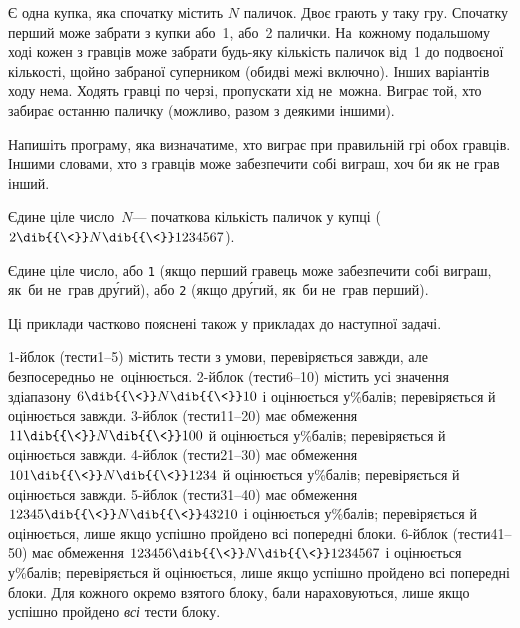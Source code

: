 
Є одна купка, яка спочатку містить $N$ паличок.
Двоє грають у таку гру.
Спочатку перший 
може забрати з купки або~1, або~2 палички.
На~кожному подальшому ході кожен з гравців може забрати 
будь-яку кількість паличок від~1 до подвоєної кількості, щойно забраної суперником (обидві межі включно).
Інших
варіантів ходу нема. 
Ходять гравці по черзі, пропускати хід не~можна.
Виграє той, хто забирає останню паличку (можливо, разом з деякими іншими).

Напишіть програму, яка визначатиме, хто виграє при правильній грі обох гравців. 
Іншими словами, хто з гравців може забезпечити собі виграш, хоч би як не грав інший.



\InputFile
Єдине ціле число~$N$\nolinebreak[3] --- початкова кількість паличок у купці
($2\dib{{\<}}N\dib{{\<}}1234567$).

\OutputFile
Єдине ціле число, або \texttt{1} (якщо перший гравець може забезпечити собі виграш, як~би не~грав др\'{у}гий), або \texttt{2} (якщо др\'{у}гий, як~би не~грав перший).

\Examples
\begin{exampleSimple}{5em}{5em}
\end{exampleSimple}


\Note Ці приклади частково пояснені також у прикладах до наступної задачі.

{

\Scoring{}\label{text:201819-2-D-scoring-begin}
\mbox{1-й}\nolinebreak[3] блок (тести\nolinebreak[3] \mbox{1--5}) містить тести з умови, перевіряється завжди, але безпосередньо не~оцінюється.
%
\mbox{2-й}\nolinebreak[3] блок (тести\nolinebreak[3] \mbox{6--10}) містить усі значення з\nolinebreak[3] діапазону $6\dib{{\<}}N\dib{{\<}}10$ і оцінюється у\%\nolinebreak[3] балів; перевіряється й оцінюється завжди.
%
\mbox{3-й}\nolinebreak[3] блок (тести\nolinebreak[3] \mbox{11--20}) має обмеження $11\dib{{\<}}N\dib{{\<}}100$ й оцінюється у\%\nolinebreak[3] балів; перевіряється й оцінюється завжди.
%
\mbox{4-й}\nolinebreak[3] блок (тести\nolinebreak[3] \mbox{21--30}) має обмеження $101\dib{{\<}}N\dib{{\<}}1234$ й оцінюється у\%\nolinebreak[3] балів; перевіряється й оцінюється завжди.
%
\mbox{5-й}\nolinebreak[3] блок (тести\nolinebreak[3] \mbox{31--40}) має обмеження $12345\dib{{\<}}N\dib{{\<}}43210$ і оцінюється у\%\nolinebreak[3] балів; перевіряється й оцінюється, лише якщо успішно пройдено всі попередні блоки.
%
\mbox{6-й}\nolinebreak[3] блок (тести\nolinebreak[3] \mbox{41--50}) має обмеження $123456\dib{{\<}}N\dib{{\<}}1234567$ і оцінюється у\%\nolinebreak[3] балів; перевіряється й оцінюється, лише якщо успішно пройдено всі попередні блоки.
%
Для кожного окремо взятого блоку, бали нараховуються, лише якщо успішно пройдено \emph{всі} тести блоку.\label{text:201819-2-D-scoring-end}

}

